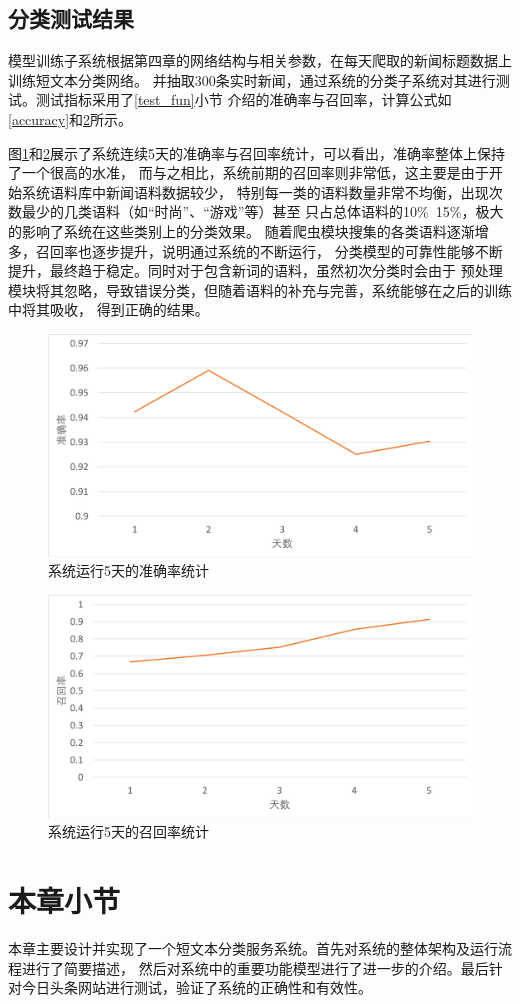 \subsection{分类测试结果}
模型训练子系统根据第四章的网络结构与相关参数，在每天爬取的新闻标题数据上训练短文本分类网络。
并抽取300条实时新闻，通过系统的分类子系统对其进行测试。测试指标采用了\ref{test_fun}小节
介绍的准确率与召回率，计算公式如\ref{accuracy}和\ref{recall}所示。

图\ref{acc}和\ref{recall}展示了系统连续5天的准确率与召回率统计，可以看出，准确率整体上保持了一个很高的水准，
而与之相比，系统前期的召回率则非常低，这主要是由于开始系统语料库中新闻语料数据较少，
特别每一类的语料数量非常不均衡，出现次数最少的几类语料（如“时尚”、“游戏”等）甚至
只占总体语料的10\%~15\%，极大的影响了系统在这些类别上的分类效果。
随着爬虫模块搜集的各类语料逐渐增多，召回率也逐步提升，说明通过系统的不断运行，
分类模型的可靠性能够不断提升，最终趋于稳定。同时对于包含新词的语料，虽然初次分类时会由于
预处理模块将其忽略，导致错误分类，但随着语料的补充与完善，系统能够在之后的训练中将其吸收，
得到正确的结果。
\begin{figure}[!hbp]
    \includegraphics[scale=0.5]{picture/acc.png}
    \caption{系统运行5天的准确率统计}
    \label{acc}
\end{figure}
\begin{figure}[!hbp]
    \includegraphics[scale=0.5]{picture/recall.png}
    \caption{系统运行5天的召回率统计}
    \label{recall}
\end{figure}

\section{本章小节}
本章主要设计并实现了一个短文本分类服务系统。首先对系统的整体架构及运行流程进行了简要描述，
然后对系统中的重要功能模型进行了进一步的介绍。最后针对今日头条网站进行测试，验证了系统的正确性和有效性。